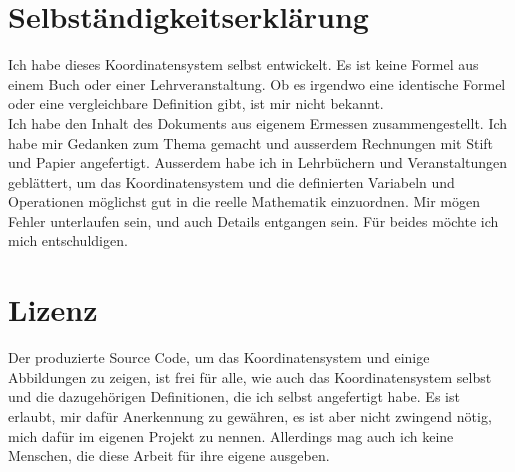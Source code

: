 \documentclass[a4paper]{article}
\begin{document}
\section{Selbst\"andigkeitserkl\"arung}

Ich habe dieses Koordinatensystem selbst entwickelt. Es ist keine Formel aus einem Buch oder einer Lehrveranstaltung.
Ob es irgendwo eine identische Formel oder eine vergleichbare Definition gibt, ist mir nicht bekannt.\\

Ich habe den Inhalt des Dokuments aus eigenem Ermessen zusammengestellt. Ich habe mir Gedanken zum Thema gemacht und
ausserdem Rechnungen mit Stift und Papier angefertigt. Ausserdem habe ich in Lehrb\"uchern und Veranstaltungen gebl\"attert,
um das Koordinatensystem und die definierten Variabeln und Operationen m\"oglichst gut in die reelle Mathematik einzuordnen.
Mir m\"ogen Fehler unterlaufen sein, und auch Details entgangen sein. F\"ur beides m\"ochte ich mich entschuldigen.\\


\section{Lizenz}

Der produzierte Source Code, um das Koordinatensystem und einige Abbildungen zu zeigen, ist frei f\"ur alle,
wie auch das Koordinatensystem selbst und die dazugeh\"origen Definitionen, die ich selbst angefertigt habe.
Es ist erlaubt, mir daf\"ur Anerkennung zu gew\"ahren, es ist aber nicht zwingend n\"otig, mich daf\"ur im
eigenen Projekt zu nennen. Allerdings mag auch ich keine Menschen, die diese Arbeit f\"ur ihre eigene ausgeben.\\
\end{document}
